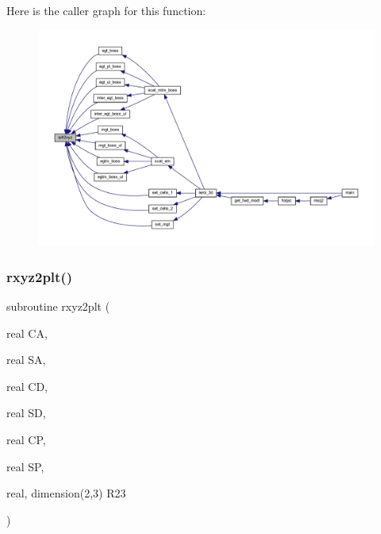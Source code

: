 Here is the caller graph for this function\+:\nopagebreak
\begin{figure}[H]
\begin{center}
\leavevmode
\includegraphics[width=350pt]{Leroi_8f90_a8ec0c93946d1a3d78ce1cabd3de6558d_icgraph}
\end{center}
\end{figure}
\mbox{\label{Leroi_8f90_af139b1e21e0c1e77a354000840adee66}} 
\subsubsection{\texorpdfstring{rxyz2plt()}{rxyz2plt()}}
{\footnotesize\ttfamily subroutine rxyz2plt (\begin{DoxyParamCaption}\item[{real}]{CA,  }\item[{real}]{SA,  }\item[{real}]{CD,  }\item[{real}]{SD,  }\item[{real}]{CP,  }\item[{real}]{SP,  }\item[{real, dimension(2,3)}]{R23 }\end{DoxyParamCaption})}

